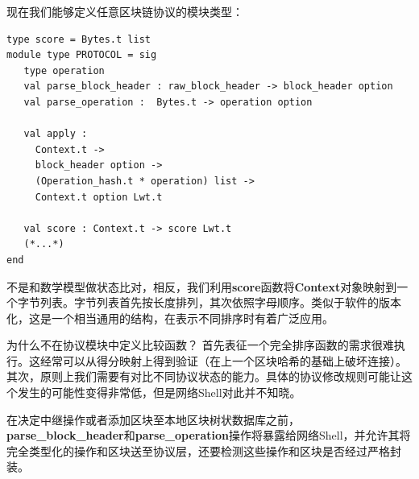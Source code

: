 \documentclass[letterpaper]{article}
\begin{document}
现在我们能够定义任意区块链协议的模块类型：

\begin{lstlisting}
type score = Bytes.t list
module type PROTOCOL = sig
   type operation
   val parse_block_header : raw_block_header -> block_header option
   val parse_operation :  Bytes.t -> operation option

   val apply :
     Context.t ->
     block_header option ->
     (Operation_hash.t * operation) list ->
     Context.t option Lwt.t

   val score : Context.t -> score Lwt.t
   (*...*)
end
\end{lstlisting}

不是和数学模型做状态比对，相反，我们利用\textbf{score}函数将\textbf{Context}对象映射到一个字节列表。字节列表首先按长度排列，其次依照字母顺序。类似于软件的版本化，这是一个相当通用的结构，在表示不同排序时有着广泛应用。

为什么不在协议模块中定义比较函数？
首先表征一个完全排序函数的需求很难执行。这经常可以从得分映射上得到验证（在上一个区块哈希的基础上破坏连接）。
其次，原则上我们需要有对比不同协议状态的能力。具体的协议修改规则可能让这个发生的可能性变得非常低，但是网络Shell对此并不知晓。

在决定中继操作或者添加区块至本地区块树状数据库之前，\textbf{parse\_block\_header}和\textbf{parse\_operation}操作将暴露给网络Shell，并允许其将完全类型化的操作和区块送至协议层，还要检测这些操作和区块是否经过严格封装。
\end{document}
